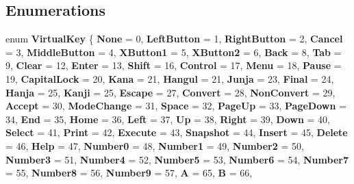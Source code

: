 \subsection*{Enumerations}
\begin{DoxyCompactItemize}
\item 
\mbox{\label{namespace_windows_1_1_system_a1a8cbbb9416665bdd61b8c82d489c265}} 
enum {\bfseries Virtual\+Key} \{ \newline
{\bfseries None} = 0, 
{\bfseries Left\+Button} = 1, 
{\bfseries Right\+Button} = 2, 
{\bfseries Cancel} = 3, 
\newline
{\bfseries Middle\+Button} = 4, 
{\bfseries X\+Button1} = 5, 
{\bfseries X\+Button2} = 6, 
{\bfseries Back} = 8, 
\newline
{\bfseries Tab} = 9, 
{\bfseries Clear} = 12, 
{\bfseries Enter} = 13, 
{\bfseries Shift} = 16, 
\newline
{\bfseries Control} = 17, 
{\bfseries Menu} = 18, 
{\bfseries Pause} = 19, 
{\bfseries Capital\+Lock} = 20, 
\newline
{\bfseries Kana} = 21, 
{\bfseries Hangul} = 21, 
{\bfseries Junja} = 23, 
{\bfseries Final} = 24, 
\newline
{\bfseries Hanja} = 25, 
{\bfseries Kanji} = 25, 
{\bfseries Escape} = 27, 
{\bfseries Convert} = 28, 
\newline
{\bfseries Non\+Convert} = 29, 
{\bfseries Accept} = 30, 
{\bfseries Mode\+Change} = 31, 
{\bfseries Space} = 32, 
\newline
{\bfseries Page\+Up} = 33, 
{\bfseries Page\+Down} = 34, 
{\bfseries End} = 35, 
{\bfseries Home} = 36, 
\newline
{\bfseries Left} = 37, 
{\bfseries Up} = 38, 
{\bfseries Right} = 39, 
{\bfseries Down} = 40, 
\newline
{\bfseries Select} = 41, 
{\bfseries Print} = 42, 
{\bfseries Execute} = 43, 
{\bfseries Snapshot} = 44, 
\newline
{\bfseries Insert} = 45, 
{\bfseries Delete} = 46, 
{\bfseries Help} = 47, 
{\bfseries Number0} = 48, 
\newline
{\bfseries Number1} = 49, 
{\bfseries Number2} = 50, 
{\bfseries Number3} = 51, 
{\bfseries Number4} = 52, 
\newline
{\bfseries Number5} = 53, 
{\bfseries Number6} = 54, 
{\bfseries Number7} = 55, 
{\bfseries Number8} = 56, 
\newline
{\bfseries Number9} = 57, 
{\bfseries A} = 65, 
{\bfseries B} = 66, 

\end{DoxyCompactItemize}
